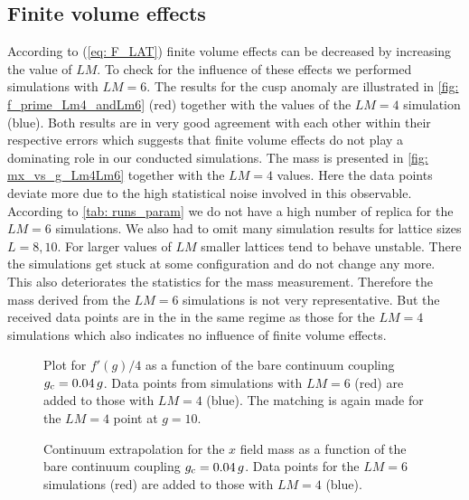 \subsection*{Finite volume effects}
According to (\ref{eq: F_LAT}) finite volume effects can be decreased by increasing the value of $LM$. To check for the influence of these effects we performed simulations with $LM=6$. The results for the cusp anomaly are illustrated in \autoref{fig: f_prime_Lm4_andLm6} (red) together with the values of the $LM=4$ simulation (blue). Both results are in very good agreement with each other within their respective errors which suggests that finite volume effects do not play a dominating role in our conducted simulations. The mass is presented in \autoref{fig: mx_vs_g_Lm4Lm6} together with the $LM=4$ values. Here the data points deviate more due to the high statistical noise involved in this observable. According to \autoref{tab: runs_param} we do not have a high number of replica for the $LM=6$ simulations. We also had to omit many simulation results for lattice sizes $L=8,10$. For larger values of $LM$ smaller lattices tend to behave unstable. There the simulations get stuck at some configuration and do not change any more. This also deteriorates the statistics for the mass measurement. Therefore the mass derived from the $LM=6$ simulations is not very representative. But the received data points are in the in the same regime as those for the $LM=4$ simulations which also indicates no influence of finite volume effects.
%
%
%
\begin{figure}
\centering

\caption{Plot for $f'(g)/4$ as a function of the bare continuum coupling $g_{\rm c}=0.04\,g$. Data points from simulations with $LM=6$ (red) are added to those with $LM=4$ (blue). The matching is again made for the $LM=4$ point at $g=10$.
\label{fig: f_prime_Lm4_andLm6}}
\end{figure}
%
%
%
\begin{figure}
\centering

\caption{Continuum extrapolation for the $x$ field mass as a function of the bare continuum coupling $g_{\rm c}=0.04\,g$. Data points for the $LM=6$ simulations (red) are added to those with $LM=4$ (blue).
\label{fig: mx_vs_g_Lm4Lm6}}
\end{figure}
%
%
%
